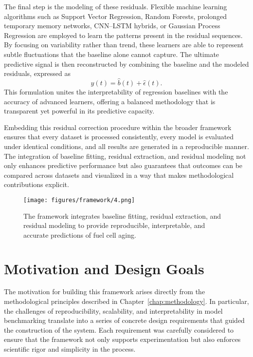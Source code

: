 The final step is the modeling of these residuals. Flexible machine learning algorithms such as Support Vector Regression, Random Forests, prolonged temporary memory networks, CNN–LSTM hybrids, or Gaussian Process Regression are employed to learn the patterns present in the residual sequences. By focusing on variability rather than trend, these learners are able to represent subtle fluctuations that the baseline alone cannot capture. The ultimate predictive signal is then reconstructed by combining the baseline and the modeled residuals, expressed as
\[
\hat{y}(t) = \hat{b}(t) + \hat{\epsilon}(t).
\]
This formulation unites the interpretability of regression baselines with the accuracy of advanced learners, offering a balanced methodology that is transparent yet powerful in its predictive capacity.

Embedding this residual correction procedure within the broader framework ensures that every dataset is processed consistently, every model is evaluated under identical conditions, and all results are generated in a reproducible manner. The integration of baseline fitting, residual extraction, and residual modeling not only enhances predictive performance but also guarantees that outcomes can be compared across datasets and visualized in a way that makes methodological contributions explicit.


\begin{figure}[htbp]
  \centering
  \texttt{[image: figures/framework/4.png]}
  \caption[Residual correction approach within the automated machine learning pipeline.]{The framework integrates baseline fitting, residual extraction, and residual modeling to provide reproducible, interpretable, and accurate predictions of fuel cell aging.}
  \label{fig:residual_correction1}
\end{figure}

\section{Motivation and Design Goals}

The motivation for building this framework arises directly from the methodological principles described in Chapter~\ref{chap:methodology}. In particular, the challenges of reproducibility, scalability, and interpretability in model benchmarking translate into a series of concrete design requirements that guided the construction of the system. Each requirement was carefully considered to ensure that the framework not only supports experimentation but also enforces scientific rigor and simplicity in the process.

